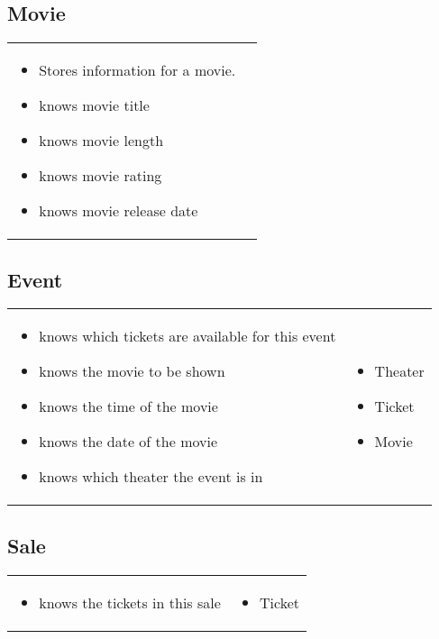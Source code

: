 \documentclass[12pt,titlepage,letterpaper]{article}
\begin{document}
\subsection{Movie}
\begin{tabular}{p{}|p{}}
\begin{itemize}
\item Stores information for a movie.
\item knows movie title
\item knows movie length
\item knows movie rating
\item knows movie release date
\end{itemize} &
\end{tabular} 
\subsection{Event}
\begin{tabular}{p{}|p{}}
\begin{itemize}
\item knows which tickets are available for this event
\item knows the movie to be shown
\item knows the time of the movie
\item knows the date of the movie
\item knows which theater the event is in
\end{itemize} &
\begin{itemize}
\item Theater
\item Ticket
\item Movie
\end{itemize}
\end{tabular} 
\subsection{Sale}
\begin{tabular}{p{}|p{}}
\begin{itemize}
\item knows the tickets in this sale
\end{itemize} &
\begin{itemize}
\item Ticket
\end{itemize}
\end{tabular} 
\end{document}

